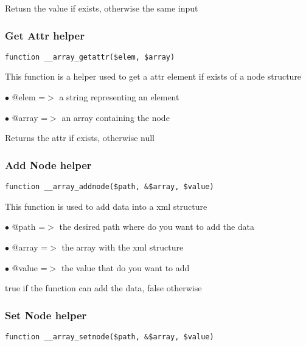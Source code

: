 \documentclass[a4paper]{article}
\begin{document}
Retusn the value if exists, otherwise the same input

\hypertarget{toc54}{}
\subsubsection{Get Attr helper}

\begin{lstlisting}
function __array_getattr($elem, $array)
\end{lstlisting}

This function is a helper used to get a attr element if exists of a node structure

\begin{compactitem}
\item[\color{myblue}$\bullet$] @elem  =$>$ a string representing an element
\item[\color{myblue}$\bullet$] @array =$>$ an array containing the node
\end{compactitem}

Returns the attr if exists, otherwise null

\hypertarget{toc55}{}
\subsubsection{Add Node helper}

\begin{lstlisting}
function __array_addnode($path, &$array, $value)
\end{lstlisting}

This function is used to add data into a xml structure

\begin{compactitem}
\item[\color{myblue}$\bullet$] @path  =$>$ the desired path where do you want to add the data
\item[\color{myblue}$\bullet$] @array =$>$ the array with the xml structure
\item[\color{myblue}$\bullet$] @value =$>$ the value that do you want to add
\end{compactitem}

true if the function can add the data, false otherwise

\hypertarget{toc56}{}
\subsubsection{Set Node helper}

\begin{lstlisting}
function __array_setnode($path, &$array, $value)
\end{lstlisting}
\end{document}
